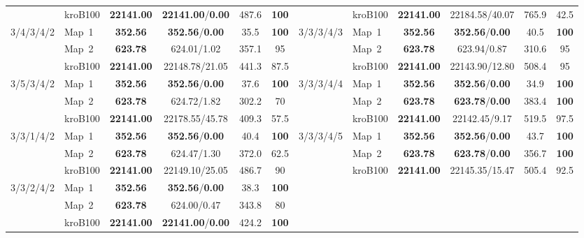 \documentclass[lettersize,journal]{IEEEtran}
\begin{document}
\begin{table}[!t]
{\begin{tabular}{llcccc|llcccc}
& kroB100 & \textbf{22141.00} & \textbf{22141.00}/\textbf{0.00} & 487.6 & \textbf{100} & & kroB100 & \textbf{22141.00} & 22184.58/40.07 & 765.9 & 42.5 \\ \cline{2-6}\cline{8-12}
\multirow{3}{*}{3/4/3/4/2} & Map~1 & \textbf{352.56} & \textbf{352.56}/\textbf{0.00} & 35.5 & \textbf{100} & \multirow{3}{*}{3/3/3/4/3} & Map~1 & \textbf{352.56} & \textbf{352.56}/\textbf{0.00} & 40.5 & \textbf{100} \\
& Map~2 & \textbf{623.78} & 624.01/1.02 & 357.1 & 95 & & Map~2 & \textbf{623.78} & 623.94/0.87 & 310.6 & 95 \\
& kroB100 & \textbf{22141.00} & 22148.78/21.05 & 441.3 & 87.5 & & kroB100 & \textbf{22141.00} & 22143.90/12.80 & 508.4 & 95 \\ \cline{2-6}\cline{8-12}
\multirow{3}{*}{3/5/3/4/2} & Map~1 & \textbf{352.56} & \textbf{352.56}/\textbf{0.00} & 37.6 & \textbf{100} & \multirow{3}{*}{3/3/3/4/4} & Map~1 & \textbf{352.56} & \textbf{352.56}/\textbf{0.00} & 34.9 & \textbf{100} \\
& Map~2 & \textbf{623.78} & 624.72/1.82 & 302.2 & 70 & & Map~2 & \textbf{623.78} & \textbf{623.78}/\textbf{0.00} & 383.4 & \textbf{100} \\
& kroB100 & \textbf{22141.00} & 22178.55/45.78 & 409.3 & 57.5 & & kroB100 & \textbf{22141.00} & 22142.45/9.17 & 519.5 & 97.5 \\ \cline{2-6}\cline{8-12}
\multirow{3}{*}{3/3/1/4/2} & Map~1 & \textbf{352.56} & \textbf{352.56}/\textbf{0.00} & 40.4 & \textbf{100} & \multirow{3}{*}{3/3/3/4/5} & Map~1 & \textbf{352.56} & \textbf{352.56}/\textbf{0.00} & 43.7 & \textbf{100} \\
& Map~2 & \textbf{623.78} & 624.47/1.30 & 372.0 & 62.5 & & Map~2 & \textbf{623.78} & \textbf{623.78}/\textbf{0.00} & 356.7 & \textbf{100} \\
& kroB100 & \textbf{22141.00} & 22149.10/25.05 & 486.7 & 90 & & kroB100 & \textbf{22141.00} & 22145.35/15.47 & 505.4 & 92.5 \\ \cline{2-6}\cline{8-12}
\multirow{3}{*}{3/3/2/4/2} & Map~1 & \textbf{352.56} & \textbf{352.56}/\textbf{0.00} & 38.3 & \textbf{100} & & & & & & \\
& Map~2 & \textbf{623.78} & 624.00/0.47 & 343.8 & 80 & & & & & & \\
& kroB100 & \textbf{22141.00} & \textbf{22141.00}/\textbf{0.00} & 424.2 & \textbf{100} & & & & & & \\
\bottomrule
\end{tabular}
}
\end{table}
\end{document}
